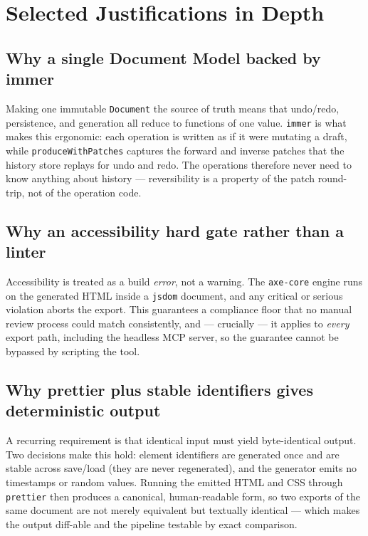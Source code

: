 \section{Selected Justifications in Depth}

\subsection*{Why a single Document Model backed by immer}
Making one immutable \texttt{Document} the source of truth means that undo/redo,
persistence, and generation all reduce to functions of one value. \texttt{immer}
is what makes this ergonomic: each operation is written as if it were mutating a
draft, while \texttt{produceWithPatches} captures the forward and inverse patches
that the history store replays for undo and redo. The operations therefore never
need to know anything about history --- reversibility is a property of the patch
round-trip, not of the operation code.

\subsection*{Why an accessibility hard gate rather than a linter}
Accessibility is treated as a build \emph{error}, not a warning. The
\texttt{axe-core} engine runs on the generated HTML inside a \texttt{jsdom}
document, and any critical or serious violation aborts the export. This guarantees
a compliance floor that no manual review process could match consistently, and ---
crucially --- it applies to \emph{every} export path, including the headless MCP
server, so the guarantee cannot be bypassed by scripting the tool.

\subsection*{Why prettier plus stable identifiers gives deterministic output}
A recurring requirement is that identical input must yield byte-identical output.
Two decisions make this hold: element identifiers are generated once and are stable
across save/load (they are never regenerated), and the generator emits no
timestamps or random values. Running the emitted HTML and CSS through
\texttt{prettier} then produces a canonical, human-readable form, so two exports of
the same document are not merely equivalent but textually identical --- which makes
the output diff-able and the pipeline testable by exact comparison.

